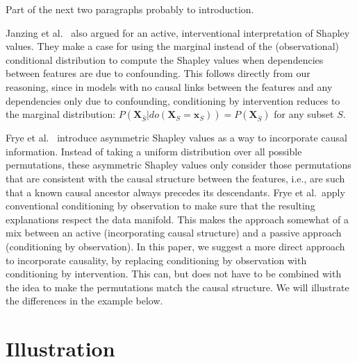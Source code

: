 \documentclass{article}
\newcommand{\vX}{\mathbf{X}}
\newcommand{\vx}{\mathbf{x}}
\newcommand{\dodo}{\mathit{do}}
\newcommand{\lvdo}[1]{\dodo(\vX_{#1} = \vx_{#1})}
\newcommand{\comment}[1]{{\color{red} #1}}
\begin{document}
\comment{Part of the next two paragraphs probably to introduction.}

Janzing et al.~\cite{janzing2019feature} also argued for an active, interventional interpretation of Shapley values. They make a case for using the marginal instead of the (observational) conditional distribution to compute the Shapley values when dependencies between features are due to confounding. This follows directly from our reasoning, since in models with no causal links between the features and any dependencies only due to confounding, conditioning by intervention reduces to the marginal distribution: $P(\vX_{\bar{S}}|\lvdo{S}) = P(\vX_{\bar{S}})$ for any subset $S$.

Frye et al.~\cite{frye2019asymmetric} introduce asymmetric Shapley values as a way to incorporate causal information. Instead of taking a uniform distribution over all possible permutations, these asymmetric Shapley values only consider those permutations that are consistent with the causal structure between the features, i.e., are such that a known causal ancestor always precedes its descendants. Frye et al.\ apply conventional conditioning by observation to make sure that the resulting explanations respect the data manifold. This makes the approach somewhat of a mix between an active (incorporating causal structure) and a passive approach (conditioning by observation). In this paper, we suggest a more direct approach to incorporate causality, by replacing conditioning by observation with conditioning by intervention. This can, but does not have to be combined with the idea to make the permutations match the causal structure. We will illustrate the differences in the example below.

\section{Illustration}
\end{document}
